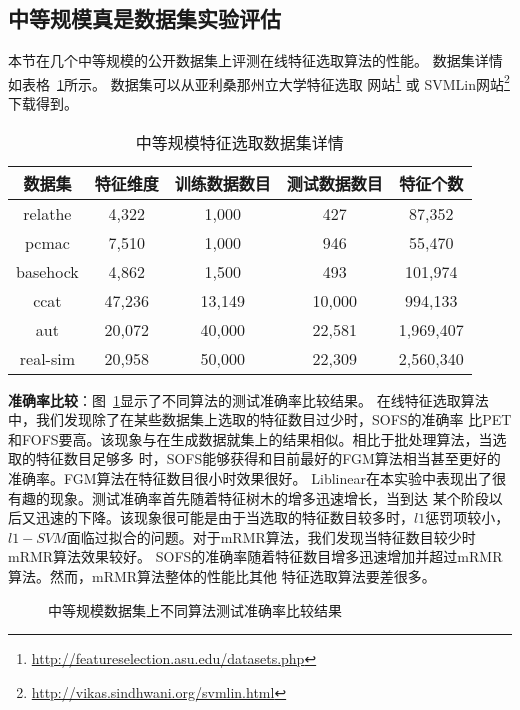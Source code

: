 \subsection{中等规模真是数据集实验评估}
本节在几个中等规模的公开数据集上评测在线特征选取算法的性能。
数据集详情如表格~\ref{tab:sofs-medium-dataset}所示。
数据集可以从亚利桑那州立大学特征选取
网站\footnote{\url{http://featureselection.asu.edu/datasets.php}} 或
SVMLin网站\footnote{\url{http://vikas.sindhwani.org/svmlin.html}}下载得到。
\begin{table}[htbp]
    \centering
    \caption{中等规模特征选取数据集详情}
    \label{tab:sofs-medium-dataset}
    \begin{tabular}{|c|c|c|c|c|}
        \hline
        数据集 & 特征维度 & 训练数据数目 & 测试数据数目 & 特征个数 \\
        \hline
        relathe & 4,322 & 1,000    & 427      & 87,352 \\
        \hline
        pcmac & 7,510 & 1,000 & 946 & 55,470 \\
        \hline
        basehock & 4,862 & 1,500    & 493 & 101,974\\
        \hline
        ccat & 47,236 & 13,149 & 10,000 & 994,133 \\
        \hline
        aut & 20,072 & 40,000 & 22,581 & 1,969,407 \\
        \hline
        real-sim & 20,958& 50,000 & 22,309 & 2,560,340 \\
        \hline
    \end{tabular}
\end{table}

\textbf{准确率比较}：图~\ref{fig:sofs-medium-test-accu-comp}显示了不同算法的测试准确率比较结果。
在线特征选取算法中，我们发现除了在某些数据集上选取的特征数目过少时，SOFS的准确率
比PET和FOFS要高。该现象与在生成数据就集上的结果相似。相比于批处理算法，当选取的特征数目足够多
时，SOFS能够获得和目前最好的FGM算法相当甚至更好的准确率。FGM算法在特征数目很小时效果很好。
Liblinear在本实验中表现出了很有趣的现象。测试准确率首先随着特征树木的增多迅速增长，当到达
某个阶段以后又迅速的下降。该现象很可能是由于当选取的特征数目较多时，$l1$惩罚项较小，
$l1-SVM$面临过拟合的问题。对于mRMR算法，我们发现当特征数目较少时mRMR算法效果较好。
SOFS的准确率随着特征数目增多迅速增加并超过mRMR算法。然而，mRMR算法整体的性能比其他
特征选取算法要差很多。
\begin{figure}[ht]
    \centerline{
    }
    \centerline{
    }
    \centerline{
    }
    \caption{中等规模数据集上不同算法测试准确率比较结果}
    \label{fig:sofs-medium-test-accu-comp}
\end{figure}

